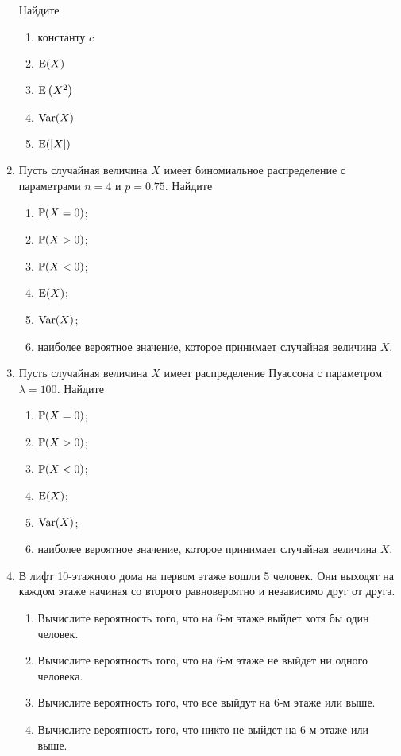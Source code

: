 \begin{enumerate}
Найдите
\begin{enumerate}
	\item константу $c$
	\item $\E(X)$
	\item $\E\left(X^2\right)$
	\item $\Var(X)$
	\item $\E(|X|)$
\end{enumerate}


\item Пусть случайная величина $X$ имеет биномиальное распределение с
параметрами $n = 4$ и $p = 0.75$.
 Найдите
\begin{enumerate}
	\item $\P(X = 0)$;
	\item $\P(X > 0)$;
	\item $\P(X < 0)$;
	\item $\E(X)$;
	\item $\Var(X)$;
	\item наиболее вероятное значение, которое принимает случайная величина $X$.
\end{enumerate}

\item  Пусть случайная величина $X$ имеет распределение Пуассона с параметром $\lambda = 100$.
Найдите
\begin{enumerate}
	\item $\P(X = 0)$;
	\item $\P(X > 0)$;
	\item $\P(X < 0)$;
	\item $\E(X)$;
	\item $\Var(X)$;
	\item наиболее вероятное значение, которое принимает случайная величина $X$.
\end{enumerate}

\item В лифт 10-этажного дома на первом этаже вошли 5 человек.
Они выходят на каждом этаже начиная со второго равновероятно и независимо
друг от друга.
\begin{enumerate}
	\item Вычислите вероятность того, что на 6-м этаже выйдет хотя бы один человек.
    \item Вычислите вероятность того, что на 6-м этаже не выйдет ни одного человека.
    \item Вычислите вероятность того, что все выйдут на 6-м этаже или выше. 
    \item Вычислите вероятность того, что никто не выйдет на 6-м этаже или выше. 
\end{enumerate}


\end{enumerate}
